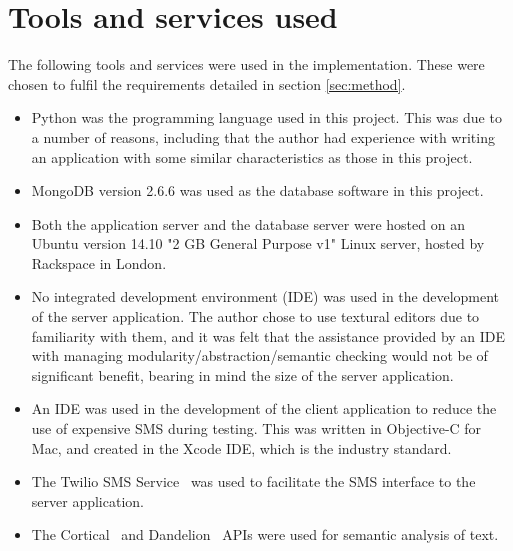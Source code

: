 \documentclass[authoryearcitations]{UoYCSproject}
\begin{document}
\section{Tools and services used}
The following tools and services were used in the implementation. These were chosen to fulfil the requirements detailed in section \ref{sec:method}.
\begin{itemize}
  \item Python was the programming language used in this project. This was due to a number of reasons, including that the author had experience with writing an application with some similar characteristics as those in this project.
  \item MongoDB version 2.6.6 was used as the database software in this project.
  \item Both the application server and the database server were hosted on an Ubuntu version 14.10 "2 GB General Purpose v1" Linux server, hosted by Rackspace in London.
  \item No integrated development environment (IDE) was used in the development of the server application. The author chose to use textural editors due to familiarity with them, and it was felt that the assistance provided by an IDE with managing modularity/abstraction/semantic checking would not be of significant benefit, bearing in mind the size of the server application.
  \item An IDE was used in the development of the client application to reduce the use of expensive SMS during testing. This was written in Objective-C for Mac, and created in the Xcode IDE, which is the industry standard.
  \item The Twilio SMS Service~\cite{serviceTwilio} was used to facilitate the SMS interface to the server application.
  \item The Cortical~\cite{serviceCorticalSim} and Dandelion~\cite{serviceDandelionSim, serviceDandelionNex} APIs were used for semantic analysis of text.
\end{itemize}
\end{document}
